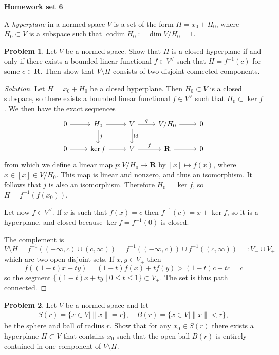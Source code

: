 \documentclass[11pt]{article}
\theoremstyle{definition}
\newtheorem{prob}{Problem}
\newcommand{\kk}[1]{\mathbf{#1}}
\def\norm#1{\| #1 \|}
\DeclareMathOperator{\id}{id}
\DeclareMathOperator{\codim}{codim}
\def\head{
\begin{center}
\textbf{\LARGE Homework set 6}
\end{center}
\medskip
}
\begin{document}
\head

A \emph{hyperplane} in a normed space $V$ is a set of the form $H = x_0 + H_0$,
where $H_0 \subset V$ is a subspace such that $\codim H_0 := \dim V / H_0 = 1$.

\begin{prob}
Let $V$ be a normed space.
Show that $H$ is a closed hyperplane if and only if there exists a bounded
linear functional $f \in V^\vee$ such that $H = f^{-1}(c)$ for some $c \in \kk R$.
Then show that $V \setminus H$ consists of two disjoint connected components.
\end{prob}

\begin{proof}[Solution]
Let $H = x_0 + H_0$ be a closed hyperplane.
Then $H_0 \subset V$ is a closed subspace, so there exists a bounded linear
functional $f \in V^\vee$ such that $H_0 \subset \ker f$.
We then have the exact sequences
\[
\begin{tikzcd}
0 \ar[r] & H_0 \ar[r] \ar[d,"j"] & V \ar[r,"q"] \ar[d,"\id"] & V / H_0 \ar[r] & 0
\\
0 \ar[r] & \ker f \ar[r] & V \ar[r,"f"] & \kk R \ar[r] & 0
\end{tikzcd}
\]
from which we define a linear map $p : V/H_0 \to \kk R$ by $[x] \mapsto f(x)$,
where $x \in [x] \in V / H_0$. This map is linear and nonzero, and thus an
isomorphism.
It follows that $j$ is also an isomorphism.
Therefore $H_0 = \ker f$, so $H = f^{-1}(f(x_0))$.

Let now $f \in V^\vee$. If $x$ is such that $f(x) = c$ then $f^{-1}(c) = x +
\ker f$, so it is a hyperplane, and closed because $\ker f = f^{-1}(0)$ is closed.

The complement is
\[
V \setminus H
= f^{-1}((-\infty, c) \cup (c, \infty))
= f^{-1}((-\infty, c)) \cup f^{-1}((c, \infty))
=: V_{-} \cup V_{+}
\]
which are two open disjoint sets.
If $x, y \in V_{+}$ then
\[
f((1-t) x + t y)
= (1-t) f(x) + t f(y)
> (1-t) c + t c = c
\]
so the segment $\{(1-t) x + ty \mid 0 \leq t \leq 1 \} \subset V_+$. The
set is thus path connected.
\end{proof}

\begin{prob}
Let $V$ be a normed space and let
\begin{align*}
S(r) = \{ x \in V \mid \norm{x} = r \},
\quad
B(r) = \{ x \in V \mid \norm{x} < r \},
\end{align*}
be the sphere and ball of radius $r$.
Show that for any $x_0 \in S(r)$ there exists a hyperplane $H \subset V$ that
contains $x_0$ such that the open ball $B(r)$ is
entirely contained in one component of $V \setminus H$.
\end{prob}
\end{document}
